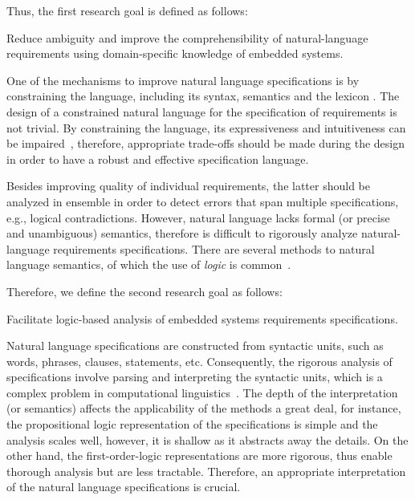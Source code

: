 Thus, the first research goal is defined as follows: 
\setcounter{rgcounter}{1}
\begin{researchgoal}
Reduce ambiguity and improve the comprehensibility of natural-language requirements using domain-specific knowledge of embedded systems.
\end{researchgoal}

One of the mechanisms to improve natural language specifications is by constraining the language, including its syntax, semantics and the lexicon \cite{Kuhn2014ALanguages}. The design of a constrained natural language for the specification of requirements is not trivial. By constraining the language, its expressiveness and intuitiveness can be impaired~\cite{ieereqspecstandard}\cite{Myachykov2013SyntacticRussian}, therefore, appropriate trade-offs should be made during the design in order to have a robust and effective specification language.

Besides improving quality of individual requirements, the latter should be analyzed in ensemble in order to detect errors that span multiple specifications, e.g., logical contradictions. However, natural language lacks formal (or precise and unambiguous) semantics, therefore is difficult to rigorously analyze natural-language requirements specifications. There are several methods to natural language semantics, of which the use of \textit{logic} is common~\cite{Clark2010TheProcessing}.

Therefore, we define the second research goal as follows: 
\begin{researchgoal}
Facilitate logic-based analysis of embedded systems requirements specifications.
\end{researchgoal}

Natural language specifications are constructed from syntactic units, such as words, phrases, clauses, statements, etc. Consequently, the rigorous analysis of specifications involve parsing and interpreting the syntactic units, which is a complex problem in computational linguistics~\cite{Clark2010TheProcessing}. The depth of the interpretation (or semantics) affects the applicability of the methods a great deal, for instance, the propositional logic representation of the specifications is simple and the analysis scales well, however, it is shallow as it abstracts away the details. On the other hand, the first-order-logic representations are more rigorous, thus enable thorough analysis but are less tractable. Therefore, an appropriate interpretation of the natural language specifications is crucial.


